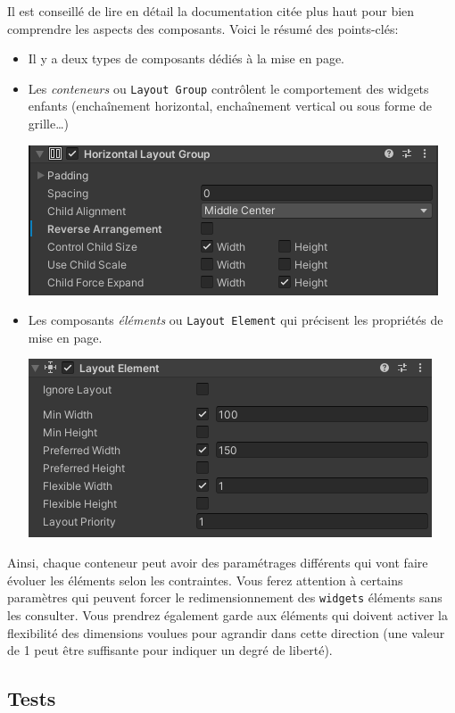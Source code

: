 \documentclass[a4paper,10pt]{article}
\begin{document}
Il est conseillé de lire en détail la documentation citée plus haut pour bien comprendre les aspects des composants. Voici le résumé des points-clés:
\begin{itemize}
	\item Il y a deux types de composants dédiés à la mise en page.
	\item Les \textit{conteneurs} ou \texttt{Layout Group} contrôlent le comportement des widgets enfants (enchaînement horizontal, enchaînement vertical ou sous forme de grille\ldots)
\begin{center}
	\includegraphics[width=0.6\linewidth]{rc/ui_layout_group_horiz}
\end{center}	
	\item Les composants \textit{éléments} ou \texttt{Layout Element} qui précisent les propriétés de mise en page.
\begin{center}
	\includegraphics[width=0.6\linewidth]{rc/ui_layout_element}
\end{center}
\end{itemize}

Ainsi, chaque conteneur peut avoir des paramétrages différents qui vont faire évoluer les éléments selon les contraintes. Vous ferez attention à certains paramètres qui peuvent forcer le redimensionnement des \texttt{widgets} éléments sans les consulter. Vous prendrez également garde aux éléments qui doivent activer la flexibilité des dimensions voulues pour agrandir dans cette direction (une valeur de 1 peut être suffisante pour indiquer un degré de liberté).

\subsection*{Tests}
\end{document}
